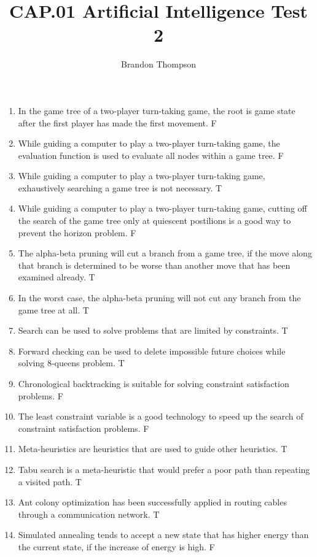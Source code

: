 \documentclass[a4paper]{article}
\begin{document}
	\title{CAP.01 Artificial Intelligence Test 2}
	\author{Brandon Thompson}
	\maketitle

	\begin{enumerate}
		\item In the game tree of a two-player turn-taking game, the root is game state after the first player has made the first movement. F
		\item While guiding a computer to play a two-player turn-taking game, the evaluation function is used to evaluate all nodes within a game tree. F
		\item While guiding a computer to play a two-player turn-taking game, exhaustively searching a game tree is not necessary. T
		\item While guiding a computer to play a two-player turn-taking game, cutting off the search of the game tree only at quiescent postilions is a good way to prevent the horizon problem. F
		\item The alpha-beta pruning will cut a branch from a game tree, if the move along that branch is determined to be worse than another move that has been examined already. T
		\item In the worst case, the alpha-beta pruning will not cut any branch from the game tree at all. T
		\item Search can be used to solve problems that are limited by constraints. T
		\item Forward checking can be used to delete impossible future choices while solving 8-queens problem. T
		\item Chronological backtracking is suitable for solving constraint satisfaction problems. F
		\item The least constraint variable is a good technology to speed up the search of constraint satisfaction problems. F
		\item Meta-heuristics are heuristics that are used to guide other heuristics. T
		\item Tabu search is a meta-heuristic that would prefer a poor path than repeating a visited path. T
		\item Ant colony optimization has been successfully applied in routing cables through a communication network. T
		\item Simulated annealing tends to accept a new state that has higher energy than the current state, if the increase of energy is high. F

\end{enumerate}
\end{document}

